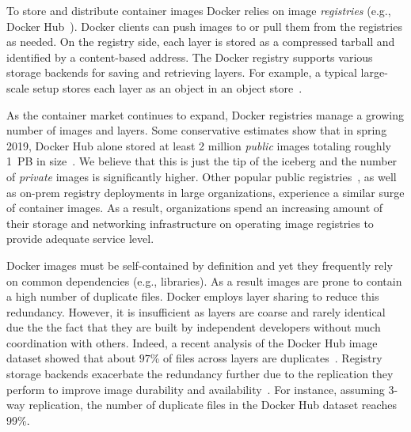 To store and distribute container images Docker relies on image
\emph{registries} (e.g., Docker Hub~\cite{docker-hub}).
%
Docker clients can push images to or pull them from the registries as needed.
%
On the registry side, each layer is stored as a compressed tarball and
identified by a content-based address.
%
The Docker registry supports various storage backends for saving and retrieving
layers. For example, a typical large-scale setup stores each layer as an object in an
object store~\cite{s3,swift}.

As the container market continues to expand, Docker registries manage a
growing number of images and layers.
%
Some conservative estimates show that in spring 2019, Docker Hub alone
stored at least 2 million \emph{public} images totaling roughly 1~PB in
size~\cite{skourtis2019carving,dedupanalysis}. 
%
We believe that this is just the tip of the iceberg and the number of
\emph{private} images is significantly higher.
%
Other popular public
registries~\cite{amazon-ecr,jfrog-artifactory,azure-cr,google-cr}, as well as
on-prem registry deployments in large organizations, experience a similar
surge of container images.
%
As a result,
organizations spend an increasing amount of their storage and networking
infrastructure on operating image registries to provide adequate service level.

%

Docker images must be self-contained by definition
and yet they frequently rely on common dependencies (e.g., libraries).
%
As a result images are prone to contain a
high number of duplicate files.
%
Docker employs layer sharing to reduce this redundancy.
%
However, it is insufficient as layers are coarse and rarely identical due the the
fact that they are built by independent developers without much coordination
with others.
%
%
Indeed, a recent analysis of the
Docker Hub image dataset showed that about $97$\% of files across layers are
duplicates~\cite{dedupanalysis}.
%
%
Registry storage backends exacerbate the redundancy further due to the
replication they perform to improve image durability and
availability~\cite{Bonvin:2010:SFS:1807128.1807162}.
%
For instance, assuming 3-way replication, the number of duplicate files in the
Docker Hub dataset reaches 99\%.
%



